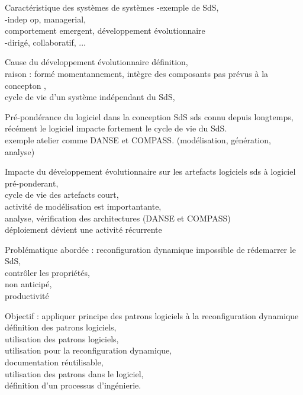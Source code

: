 

\begin{frame}{Caractéristique des systèmes de systèmes}
-exemple de SdS,\\
-indep op, managerial, \\
comportement emergent, développement évolutionnaire\\
-dirigé, collaboratif, ...
\end{frame}

\begin{frame}{Cause du développement évolutionnaire}
définition, \\
raison : 
formé momentannement, 
intègre des composants pas prévus à la concepton ,\\
cycle de vie d'un système indépendant du SdS,\\
\end{frame}

\begin{frame}{Pré-pondérance du logiciel dans la conception SdS}
sds connu depuis longtemps, récément le logiciel impacte fortement le cycle de vie du SdS.\\
exemple atelier comme DANSE et COMPASS. (modélisation, génération, analyse)
\end{frame}

\begin{frame}{Impacte du développement évolutionnaire sur les artefacts logiciels}
sds à logiciel pré-ponderant,\\ 
cycle de vie des artefacts court,\\
activité de modélisation
est importantante,  \\
analyse, vérification des architectures (DANSE et COMPASS)\\
déploiement
dévient une activité récurrente
\end{frame}

\begin{frame}{Problématique abordée : reconfiguration dynamique}
impossible de 
rédemarrer le SdS,\\
contrôler les propriétés, \\
non anticipé, \\
productivité
\end{frame}

\begin{frame}{Objectif : appliquer principe des patrons logiciels à la reconfiguration dynamique}
définition des patrons logiciels,\\
utilisation des patrons logiciels,\\
utilisation pour la reconfiguration dynamique,\\
documentation réutilisable,\\
utilisation des patrons dans le logiciel,\\
définition d'un processus d'ingénierie.
\end{frame}

